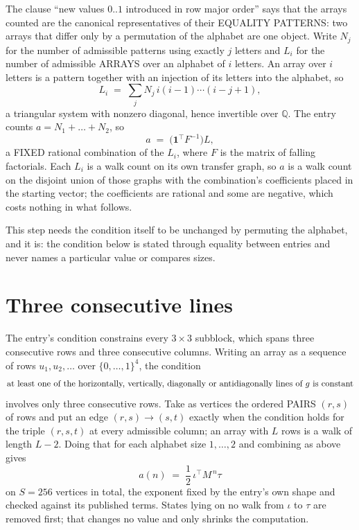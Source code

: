 \documentclass[11pt,a4paper]{article}
\theoremstyle{plain}
\theoremstyle{definition}
\begin{document}
The clause ``new values $0..1$ introduced in row major order'' says that the arrays
counted are the canonical representatives of their EQUALITY PATTERNS: two arrays that differ
only by a permutation of the alphabet are one object. Write $N_j$ for the number of admissible
patterns using exactly $j$ letters and $L_i$ for the number of admissible ARRAYS over an
alphabet of $i$ letters. An array over $i$ letters is a pattern together with an injection of
its letters into the alphabet, so
\[
L_i\;=\;\sum_{j}N_j\,i(i-1)\cdots(i-j+1),
\]
a triangular system with nonzero diagonal, hence invertible over $\mathbb{Q}$. The entry
counts $a=N_1+\dots+N_{2}$, so
\[
a\;=\;\bigl(\mathbf{1}^{\!\top}F^{-1}\bigr)L ,
\]
a FIXED rational combination of the $L_i$, where $F$ is the matrix of falling factorials.
Each $L_i$ is a walk count on its own transfer graph, so $a$ is a walk count on the disjoint
union of those graphs with the combination's coefficients placed in the starting vector; the
coefficients are rational and some are negative, which costs nothing in what follows.

This step needs the condition itself to be unchanged by permuting the alphabet, and it is:
the condition below is stated through equality between entries and never names a particular
value or compares sizes.

\section{Three consecutive lines}

The entry's condition constrains every $3\times3$ subblock, which spans three consecutive
rows and three consecutive columns. Writing an array as a sequence of rows
$u_1,u_2,\dots$ over $\{0,\dots,1\}^{4}$, the condition
\[
\text{at least one}\text{ of the horizontally, vertically, diagonally or antidiagonally lines of }g\text{ \text{is constant}}
\]
involves only three consecutive rows. Take as vertices the ordered PAIRS $(r,s)$ of
rows and put an edge $(r,s)\to(s,t)$ exactly when the condition holds for the triple
$(r,s,t)$ at every admissible column; an array with $L$ rows is a walk of length $L-2$.
Doing that for each alphabet size $1,\dots,2$ and combining as above gives
\[
a(n)\;=\;\frac{1}{2}\,\iota^{\!\top}M^{\,n}\tau
\]
on $S=256$ vertices in total, the exponent fixed by the entry's own shape and checked against
its published terms. States lying on no walk from $\iota$ to $\tau$ are removed first; that
changes no value and only shrinks the computation.
\end{document}
